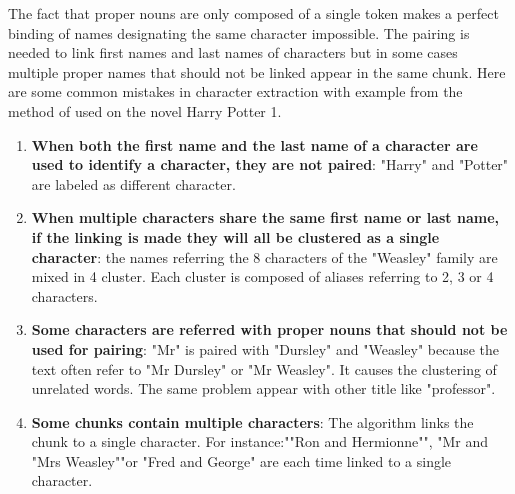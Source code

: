 \documentclass[a4paper, 12pt]{report}
\begin{document}
 The fact that proper nouns are only composed of a single token makes a perfect binding of names designating the same character impossible. 
 The pairing is needed to link first names and last names of characters but in some cases multiple proper names that should not be linked appear in the same chunk. 
 Here are some common mistakes in character extraction with example from the method of \cite{original} used on the novel Harry Potter 1.
\begin{enumerate}
    \item \textbf{When both the first name and the last name of a character are used to identify a character, they are not paired}: "Harry" and "Potter" are labeled as different character.
    
    \item \textbf{When multiple characters share the same first name or last name, if the linking is made they will all be clustered as a single character}: the names referring the 8 characters of the "Weasley" family are mixed in 4 cluster. Each cluster is composed of aliases referring to 2, 3 or 4 characters.
    
    \item \textbf{Some characters are referred with proper nouns that should not be used for pairing}: "Mr" is paired with "Dursley" and "Weasley" because the text often refer to "Mr Dursley" or "Mr Weasley". It causes the clustering of unrelated words. The same problem appear with other title like "professor". 
    
    \item \textbf{Some chunks contain multiple characters}: The algorithm links the chunk to a single character. 
	For instance:""Ron and Hermionne"", "Mr and "Mrs Weasley""or "Fred and George" are each time linked to a single character.
\end{enumerate}
\end{document}
